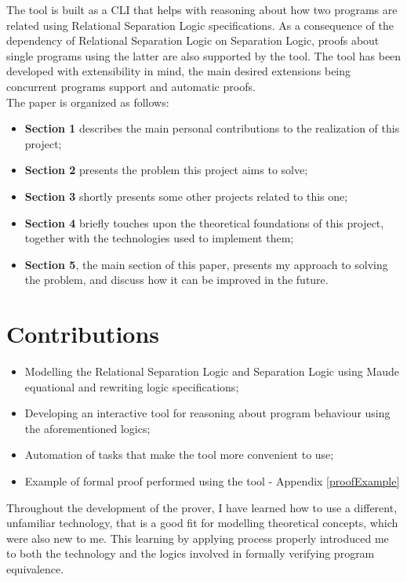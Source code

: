 \documentclass[12pt,a4paper]{article}
\begin{document}
The tool is built as a CLI that helps with reasoning about how two programs are related using Relational Separation Logic specifications. As a consequence of the dependency of Relational Separation Logic on Separation Logic, proofs about single programs using the latter are also supported by the tool. The tool has been developed with extensibility in mind, the main desired extensions being concurrent programs support and automatic proofs. \\

The paper is organized as follows: 
\begin{itemize}
	\item {\textbf{Section 1} describes the main personal contributions to the realization of this project;}
	\item {\textbf{Section 2} presents the problem this project aims to solve;}
	\item {\textbf{Section 3} shortly presents some other projects related to this one;}
	\item {\textbf{Section 4} briefly touches upon the theoretical foundations of this project, together with the technologies used to implement them;}
	\item {\textbf{Section 5}, the main section of this paper, presents my approach to solving the problem, and discuss how it can be improved in the future.}
\end{itemize}
\section{Contributions}
\begin{itemize}
	\item Modelling the Relational Separation Logic and Separation Logic using Maude equational and rewriting logic specifications; 
	\item Developing an interactive tool for reasoning about program behaviour using the aforementioned logics;
	\item Automation of tasks that make the tool more convenient to use;
	\item Example of formal proof performed using the tool - Appendix \ref{proofExample}
\end{itemize}
Throughout the development of the prover, I have learned how to use a different, unfamiliar technology, that is a good fit for  modelling theoretical concepts, which were also new to me. This learning by applying process properly introduced me to both the technology and the logics involved in formally verifying program equivalence. 
\end{document}
